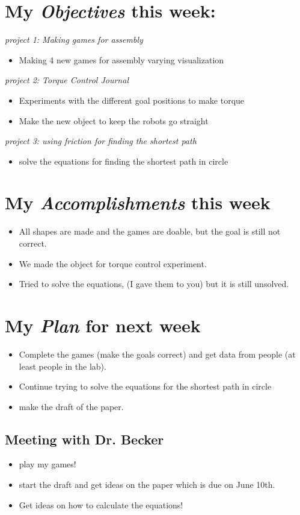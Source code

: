 \newcommand{\handoutName}{Weekly report}
\newcommand{\handoutdate}{\today}


\section{My \emph{Objectives} this week:}

\emph{project 1: Making games for assembly}
\begin{itemize}
\item Making 4 new games for assembly varying visualization
\end{itemize}

\emph{project 2: Torque Control Journal}
\begin{itemize}
\item Experiments with the different goal positions to make torque
\item Make the new object to keep the robots go straight
\end{itemize}

\emph{project 3: using friction for finding the shortest path}
\begin{itemize}
\item solve the equations for finding the shortest path in circle
\end{itemize}




\section{My \emph{Accomplishments} this week}


\begin{itemize}
\item All shapes are made and the games are doable, but the goal is still not correct.
\item We made the object for torque control experiment.
\item Tried to solve the equations, (I gave them to you) but it is still unsolved.
\end{itemize}


\section{My \emph{Plan} for next week}

\begin{itemize}
\item Complete the games (make the goals correct) and get data from people (at least people in the lab).
\item Continue trying to solve the equations for the shortest path in circle
\item make the draft of the paper.
\end{itemize}

\subsection{Meeting with Dr. Becker  }

\begin{itemize}
\item play my games!
\item start the draft and get ideas on the paper which is due on June 10th.
\item Get ideas on how to calculate the equations!
\end{itemize}


